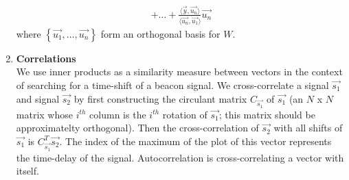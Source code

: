 \documentclass[10pt]{article}
\begin{document}
\begin{multicols}{2}
\begin{enumerate}
\begin{align*}
        + \hdots + \frac{\langle \vec{y} , \vec{u_n} \rangle}{\langle \vec{u_n} , \vec{u_1} \rangle}\vec{u_n}
    \end{align*}
    where $\left\{\vec{u_1}, \hdots, \vec{u_n}\right\}$ form an orthogonal basis for $W$. 
    \item \textbf{Correlations} \\ We use inner products as a similarity measure between vectors in the context of
    searching for a time-shift of a beacon signal. We cross-correlate a signal $\vec{s_1}$ and signal $\vec{s_2}$ by first constructing the circulant matrix $C_{\vec{s_1}}$ of $\vec{s_1}$ (an $N$ x $N$ matrix whose $i^{th}$ column is the $i^{th}$ rotation of $\vec{s_1}$; this matrix should be approximatelty orthogonal). Then the cross-correlation of $\vec{s_2}$ with all shifts of $\vec{s_1}$ is $C_{\vec{s_1}}^T\vec{s_2}$. The index of the maximum of the plot of this vector represents the time-delay of the signal. Autocorrelation is cross-correlating a vector with itself.
    

\end{enumerate}
\end{multicols}
\end{document}
